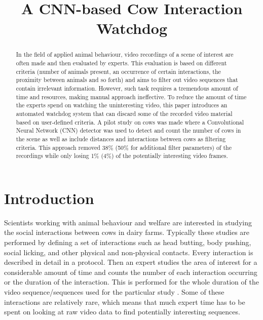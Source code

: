 \documentclass{cta-author}
\begin{document}
\title{A CNN-based Cow Interaction Watchdog}

\author{   }
\address{
}


\begin{abstract}
In the field of applied animal behaviour, video recordings of a scene of interest are often made and then 
evaluated by experts. This evaluation is based on different criteria (number of animals present, an 
occurrence of certain interactions, the proximity between animals and so forth) and aims to filter out video 
sequences that contain irrelevant information.  However,  such task requires a tremendous amount of time and 
resources, making manual approach ineffective. To reduce the amount of time the experts spend on watching the 
uninteresting video, this paper introduces an automated watchdog system that can discard some of the recorded 
video material based on user-defined criteria. A pilot study on cows was made where a Convolutional Neural 
Network (CNN) detector was used to detect and count the number of cows in the scene as well as include 
distances and interactions between cows as filtering criteria. This approach removed 38\% (50\% for 
additional filter parameters) of the recordings while only losing 1\% (4\%) of the potentially interesting 
video frames. 
\end{abstract}

\maketitle

\section{Introduction}

Scientists working with animal behaviour and welfare are interested in studying the social interactions 
between cows in dairy farms. Typically these studies are performed by defining a set of interactions such as 
head butting, body pushing, social licking, and other physical and non-physical contacts. Every interaction 
is described in detail in a protocol. Then an expert studies the area of interest for a considerable amount 
of time and counts the number of each interaction occurring or the duration of the interaction. This is 
performed for the whole duration of the video sequence/sequences used for the particular study 
\cite{MartinandBateson2007}. Some of these interactions are relatively rare, which means that much expert 
time has to be spent on looking at raw video data to find potentially interesting sequences.
\end{document}
